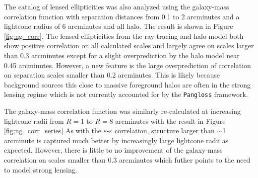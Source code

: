 \documentclass[%
 reprint,
 amsmath,amssymb,
 aps,nofootinbib
]{revtex4-1}
\begin{document}
The catalog of lensed ellipticities was also analyzed using the galaxy-mass correlation function with separation distances from 0.1 to 2 arcminutes and a lightcone radius of 6 arcminutes and all halo. The result is shown in Figure \ref{fig:ng_corr}. The lensed ellipticities from the ray-tracing and halo model both show positive correlation on all calculated scales and largely agree on scales larger than 0.3 arcminutes except for a slight overprediction by the halo model near 0.45 arcminutes. However, a new feature is the large overprediction of correlation on separation scales smaller than 0.2 arcminutes. This is likely because background sources this close to massive foreground halos are often in the strong lensing regime which is not currently accounted for by the \texttt{Pangloss} framework.

The galaxy-mass correlation function was similarly re-calculated at increasing lightcone radii from $R=1$ to $R=8$ arcminutes with the result in Figure \ref{fig:ng_corr_series} As with the $\varepsilon$-$\varepsilon$ correlation, structure larger than $\sim$1 arcminute is captured much better by increasingly large lightcone radii as expected. However, there is little to no improvement of the galaxy-mass correlation on scales smaller than 0.3 arcminutes which futher points to the need to model strong lensing.
\end{document}
